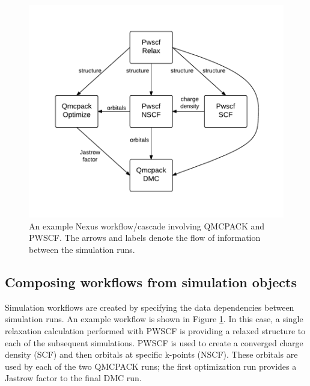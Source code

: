 \documentclass[oneside,11pt]{memoir}
\numberwithin{equation}{section}
\begin{document}
\FloatBarrier
\begin{figure}
  \includegraphics[trim={0 0 0 0},clip,width=\textwidth]{./figures/Nexus_workflow_example.pdf}
  \caption{An example Nexus workflow/cascade involving QMCPACK and PWSCF.  The arrows and labels denote the flow of information between the simulation runs.\label{fig:example_workflow}}
\end{figure}
\FloatBarrier


\subsection{Composing workflows from simulation objects}
Simulation workflows are created by specifying the data dependencies between simulation runs.  An example workflow is shown in Figure \ref{fig:example_workflow}.  In this case, a single relaxation calculation performed with PWSCF is providing a relaxed structure to each of the subsequent simulations.  PWSCF is used to create a converged charge density (SCF) and then orbitals at specific k-points (NSCF).  These orbitals are used by each of the two QMCPACK runs; the first optimization run provides a Jastrow factor to the final DMC run.  
\end{document}
